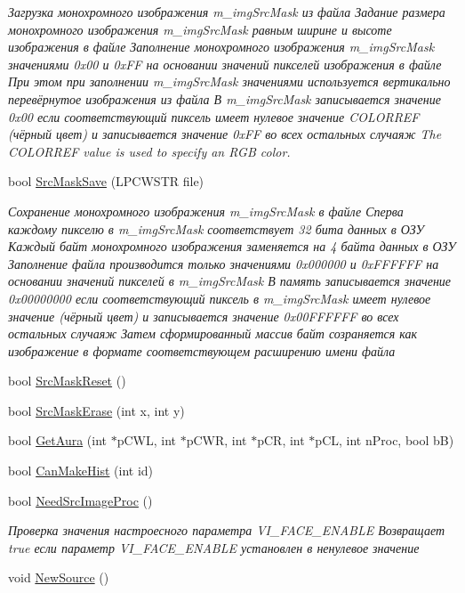 \begin{DoxyCompactItemize}
\begin{DoxyCompactList}\small\item\em Загрузка монохромного изображения m\+\_\+img\+Src\+Mask из файла Задание размера монохромного изображения m\+\_\+img\+Src\+Mask равным ширине и высоте изображения в файле Заполнение монохромного изображения m\+\_\+img\+Src\+Mask значениями 0x00 и 0x\+F\+F на основании значений пикселей изображения в файле При этом при заполнении m\+\_\+img\+Src\+Mask значениями используется вертикально перевёрнутое изображения из файла В m\+\_\+img\+Src\+Mask записывается значение 0x00 если соответствующий пиксель имеет нулевое значение C\+O\+L\+O\+R\+R\+E\+F (чёрный цвет) и записывается значение 0x\+F\+F во всех остальных случаяж The C\+O\+L\+O\+R\+R\+E\+F value is used to specify an R\+G\+B color. \end{DoxyCompactList}\item 
bool \hyperlink{class_c_v_i_engine_base_a1d96cf239567fda73e26950353c69159}{Src\+Mask\+Save} (L\+P\+C\+W\+S\+T\+R file)
\begin{DoxyCompactList}\small\item\em Сохранение монохромного изображения m\+\_\+img\+Src\+Mask в файле Сперва каждому пикселю в m\+\_\+img\+Src\+Mask соответствует 32 бита данных в ОЗУ Каждый байт монохромного изображения заменяется на 4 байта данных в ОЗУ Заполнение файла производится только значениями 0x000000 и 0x\+F\+F\+F\+F\+F\+F на основании значений пикселей в m\+\_\+img\+Src\+Mask В память записывается значение 0x00000000 если соответствующий пиксель в m\+\_\+img\+Src\+Mask имеет нулевое значение (чёрный цвет) и записывается значение 0x00\+F\+F\+F\+F\+F\+F во всех остальных случаяж Затем сформированный массив байт созраняется как изображение в формате соответствующем расширению имени файла \end{DoxyCompactList}\item 
bool \hyperlink{class_c_v_i_engine_base_ac394163149bb674cf127f16392f41047}{Src\+Mask\+Reset} ()
\item 
bool \hyperlink{class_c_v_i_engine_base_aa12afe22df5c306e03eb855d4fed4fce}{Src\+Mask\+Erase} (int x, int y)
\item 
bool \hyperlink{class_c_v_i_engine_base_aaa7d51c8145d1094997fc485508dd402}{Get\+Aura} (int $\ast$p\+C\+W\+L, int $\ast$p\+C\+W\+R, int $\ast$p\+C\+R, int $\ast$p\+C\+L, int n\+Proc, bool b\+B)
\item 
bool \hyperlink{class_c_v_i_engine_base_a33937f3f067ec0fa9829c7a40b54be50}{Can\+Make\+Hist} (int id)
\item 
bool \hyperlink{class_c_v_i_engine_base_a1d144bb4fec300b83067404ffdc9ae6f}{Need\+Src\+Image\+Proc} ()
\begin{DoxyCompactList}\small\item\em Проверка значения настроесного параметра V\+I\+\_\+\+F\+A\+C\+E\+\_\+\+E\+N\+A\+B\+L\+E Возвращает true если параметр V\+I\+\_\+\+F\+A\+C\+E\+\_\+\+E\+N\+A\+B\+L\+E установлен в ненулевое значение \end{DoxyCompactList}\item 
void \hyperlink{class_c_v_i_engine_base_afcadee160287c12571501a09c222bea3}{New\+Source} ()
\end{DoxyCompactItemize}
